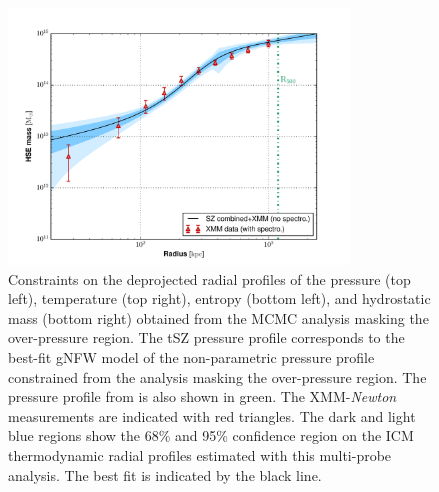 \documentclass[traditabstract]{aa}
\begin{document}
\begin{figure}[h!]
\includegraphics[height=6.8cm]{M_profile.pdf}
\caption{{\footnotesize Constraints on the deprojected radial profiles of the pressure (top left), temperature (top right), entropy (bottom left), and hydrostatic mass (bottom right) obtained from the MCMC analysis masking the over-pressure region. The tSZ pressure profile corresponds to the best-fit gNFW model of the non-parametric pressure profile constrained from the analysis masking the over-pressure region. The pressure profile from \cite{you15} is also shown in green. The XMM-{\it Newton} measurements are indicated with red triangles. The dark and light blue regions show the 68\% and 95\% confidence region on the ICM thermodynamic radial profiles estimated with this multi-probe analysis. The best fit is indicated by the black line.}}
\label{fig:ICM_profiles}
\end{figure}
\end{document}
